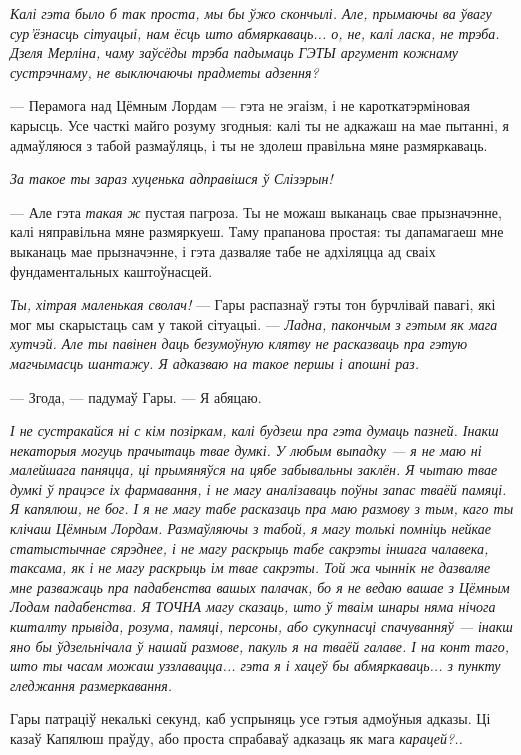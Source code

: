 \emph{Калі гэта было б так проста, мы бы ўжо скончылі. Але, прымаючы ва ўвагу
сур'ёзнасць сітуацыі, нам ёсць што абмяркаваць... о, не, калі ласка, не трэба.
Дзеля Мерліна, чаму заўсёды трэба падымаць ГЭТЫ аргумент кожнаму сустрэчнаму,
не выключаючы прадметы адзення?}

--- Перамога над Цёмным Лордам --- гэта не эгаізм, і не кароткатэрміновая
карысць. Усе часткі майго розуму згодныя: калі ты не адкажаш на мае пытанні, 
я адмаўляюся з табой размаўляць, і ты не здолеш правільна мяне размяркаваць.
    
\emph{За такое ты зараз хуценька адправішся ў Слізэрын!}

--- Але гэта \emph{такая ж} пустая пагроза. Ты не можаш выканаць свае прызначэнне,
калі няправільна мяне размяркуеш. Таму прапанова простая: ты дапамагаеш мне
выканаць мае прызначэнне, і гэта дазваляе табе не адхіляцца ад сваіх
фундаментальных каштоўнасцей.

\emph{Ты, хітрая маленькая сволач!} --- Гары распазнаў гэты тон бурчлівай павагі,
які мог мы скарыстаць сам у такой сітуацыі. --- 
\emph{Ладна, пакончым з гэтым як мага хутчэй. Але ты павінен даць 
безумоўную клятву не расказваць пра гэтую магчымасць шантажу.
Я адказваю на такое першы і апошні раз.}

--- Згода, --- падумаў Гары. --- Я абяцаю.

\emph{І не сустракайся ні с кім позіркам, калі будзеш пра гэта думаць 
пазней. Інакш некаторыя могуць прачытаць твае думкі.
У любым выпадку --- я не маю ні малейшага паняцца, ці прымяняўся на цябе
забывальны заклён. Я чытаю твае думкі ў працэсе іх фармавання, і не 
магу аналізаваць поўны запас тваёй памяці. Я капялюш, не бог.
І я не магу табе расказаць пра маю размову з тым, каго ты клічаш 
Цёмным Лордам. Размаўляючы з табой, я магу толькі помніць нейкае статыстычнае
сярэднее, і не магу раскрыць табе сакрэты іншага чалавека, таксама, як і не
магу раскрыць ім твае сакрэты. Той жа чыннік не дазваляе мне разважаць пра 
падабенства вашых палачак, бо я не ведаю вашае з Цёмным Лодам падабенства.
Я ТОЧНА магу сказаць, што ў тваім шнары няма нічога кшталту прывіда, 
розума, памяці, персоны, або сукупнасці спачуванняў --- інакш яно бы ўдзельнічала
ў нашай размове, пакуль я на тваёй галаве. І на конт таго, што ты часам 
можаш уззлавацца... гэта я і хацеў бы абмяркаваць... з пункту гледжання 
размеркавання.}

Гары патраціў некалькі секунд, каб успрыняць усе гэтыя адмоўныя адказы. Ці 
казаў Капялюш праўду, або проста спрабаваў адказаць
як мага \emph{карацей?..}

